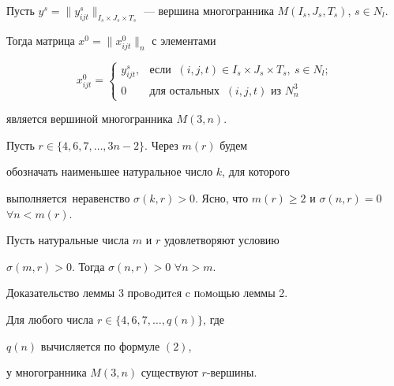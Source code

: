 \begin{lem}


Пусть $y^s=\|y^s_{ijt}\|_{I_s\times


J_s\times T_s}$ --- вершина многогранника $M(I_s,J_s,T_s)$, $s\in N_l$.


Тогда матрица $x^0=\|x^0_{ijt}\|_n$ с элементами


\begin{equation}


x^0_{ijt}=


\begin{cases}


y^s_{ijt},&\text{если }\ (i,j,t)\in I_s\times J_s\times T_s,


\ s\in N_l;\\


0 &\text{для остальных }\ (i,j,t)\text{ из }N^3_n


\end{cases}


\end{equation}


является вершиной многогранника $M(3,n)$.


\end{lem}





Пусть $r\in \{4,6,7,\dotsc,3n-2\}$. Через $m(r)$ будем


обозначать наименьшее натуральное число $k$, для которого


выполняется~неравенство $\sigma(k,r)>0$. Ясно, что $m(r)\geq 2$ и $\sigma


(n,r)=0$ $\forall n<m(r)$.





\begin{lem}


Пусть натуральные числа $m$ и $r$ удовлетворяют условию


$\sigma (m,r)>0$. Тогда $\sigma (n,r)>0$ $\forall n>m$.


\end{lem}





Доказательство леммы 3 прoвoдитcя c пoмoщью леммы 2.





\begin{thm}


Для любого числа $r\in \{4,6,7,\dotsc,q(n)\}$, где


$q(n)$ вычисляется по формуле $(2)$,


у многогранника $M(3,n)$ существуют $r$-вершины.


\end{thm}






